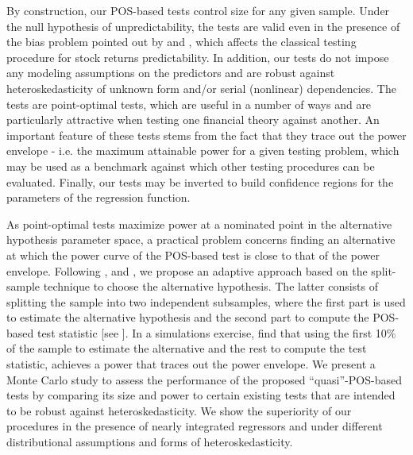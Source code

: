 \documentclass[harvard,11pt]{article}
\begin{document}
By construction, our POS-based tests control size for any given sample. Under the null hypothesis of unpredictability, the
tests are valid even in the presence of the bias problem pointed out by
\citet{mankiw1986we} and \citet{stambaugh1985bias,stambaugh1999predictive}, which affects the
classical testing procedure for stock returns predictability. In addition,
our tests do not impose any modeling assumptions on the predictors and are robust against heteroskedasticity of unknown form and/or serial (nonlinear) dependencies. The tests are point-optimal tests, which are
useful in a number of ways and are particularly attractive when testing
one financial theory against another. An important feature of these tests
stems from the fact that they trace out the power envelope - i.e. the maximum
attainable power for a given testing problem, which may be used as a
benchmark against which other testing procedures can be evaluated. Finally, our
tests may be inverted to build confidence regions for the parameters
of the regression function.

As point-optimal tests maximize power at a nominated point in the alternative hypothesis parameter space, a practical problem concerns finding an alternative at which the power curve of the POS-based test is close to that of the power envelope. Following \citet{dufour1998union}, \citet{dufour2001finite} and \citet{dufour2010exact}, we propose an adaptive approach based on the split-sample technique to choose the alternative hypothesis. The latter consists of splitting the sample into two independent subsamples, where the first part is used to estimate the alternative hypothesis and the second part to compute the POS-based test statistic [see \citet{2008finite}]. In a simulations exercise, \citet{dufour2010exact} find that using the first 10\% of the sample to estimate the alternative and the rest to compute the test statistic, achieves a power that traces out the power envelope. We present a Monte Carlo study to assess the performance of the proposed \textquotedblleft quasi\textquotedblright-POS-based tests by comparing its size and power to certain existing tests that are intended to be robust against heteroskedasticity. We show the superiority of our procedures in the presence of nearly integrated regressors and under different distributional assumptions and forms of heteroskedasticity. 
\end{document}
